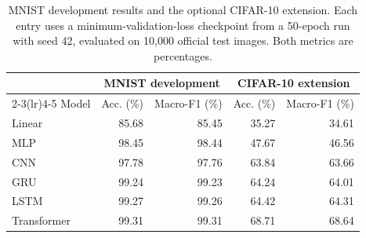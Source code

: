 \begin{table}[htbp]
\centering\small
\caption[MNIST development and CIFAR-10 extension results]{MNIST development results and the optional CIFAR-10 extension.
Each entry uses a minimum-validation-loss checkpoint from a 50-epoch run with
seed 42, evaluated on 10,000 official test images. Both metrics are percentages.}
\label{tab:additional-results}
\begin{tabular}{lrrrr}
\toprule
& \multicolumn{2}{c}{MNIST development} & \multicolumn{2}{c}{CIFAR-10 extension}\\
\cmidrule(lr){2-3}\cmidrule(lr){4-5}
Model & Acc. (\%) & Macro-F1 (\%) & Acc. (\%) & Macro-F1 (\%)\\
\midrule
Linear & 85.68 & 85.45 & 35.27 & 34.61 \\
MLP & 98.45 & 98.44 & 47.67 & 46.56 \\
CNN & 97.78 & 97.76 & 63.84 & 63.66 \\
GRU & 99.24 & 99.23 & 64.24 & 64.01 \\
LSTM & 99.27 & 99.26 & 64.42 & 64.31 \\
Transformer & 99.31 & 99.31 & 68.71 & 68.64 \\
\bottomrule
\end{tabular}
\end{table}
